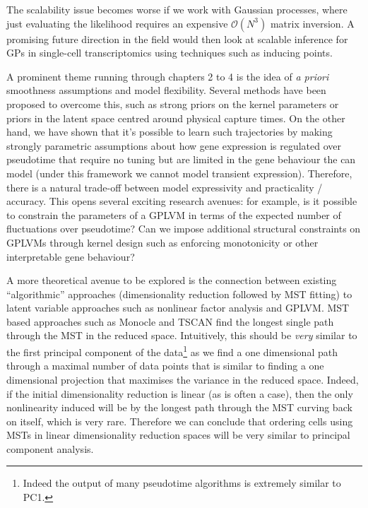 The scalability issue becomes worse if we work with Gaussian processes, where just evaluating the likelihood requires an expensive $\mathcal{O}(N^3)$ matrix inversion. A promising future direction in the field would then look at scalable inference for GPs in single-cell transcriptomics using techniques such as inducing points.

A prominent theme running through chapters 2 to 4   is the idea of \emph{a priori} smoothness assumptions and model flexibility. %
Several methods have been proposed to overcome this, such as strong priors on the kernel parameters or priors in the latent space centred around physical capture times. On the other hand, we have shown that it's possible to learn such trajectories by making strongly parametric assumptions about how gene expression is regulated over pseudotime that require no tuning but are limited in the gene behaviour the can model (under this framework we cannot model transient expression). Therefore, there is a natural trade-off between model expressivity and practicality / accuracy. This opens several exciting research avenues: for example, is it possible to constrain the parameters of a GPLVM in terms of the expected number of fluctuations over pseudotime? Can we impose additional structural constraints on GPLVMs through kernel design such as enforcing monotonicity or other interpretable gene behaviour?

A more theoretical avenue to be explored is the connection between existing ``algorithmic'' approaches (dimensionality reduction followed by MST fitting) to latent variable approaches such as nonlinear factor analysis and GPLVM. MST based approaches such as Monocle and TSCAN find the longest single path through the MST in the reduced space. Intuitively, this should be \emph{very} similar to the first principal component of the data\footnote{
    Indeed the output of many pseudotime algorithms is extremely similar to PC1.
} as we find a one dimensional path through a maximal number of data points that is similar to finding a one dimensional projection that maximises the variance in the reduced space. Indeed, if the initial dimensionality reduction is linear (as is often a case), then the only nonlinearity induced will be by the longest path through the MST curving back on itself, which is very rare. Therefore we can conclude that ordering cells using MSTs in linear dimensionality reduction spaces will be very similar to principal component analysis.

